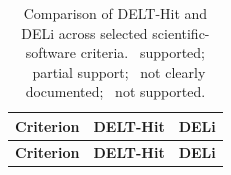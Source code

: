 \documentclass[pdflatex,sn-nature]{sn-jnl}
\begin{document}
\newcommand{\statusgreen}{\raisebox{0.15ex}{\textcolor{green!50!black}{\LARGE$\bullet$}}}
\newcommand{\statusamber}{\raisebox{0.15ex}{\textcolor{orange!90!black}{\LARGE$\bullet$}}}
\newcommand{\statusopen}{\raisebox{0.15ex}{\textcolor{black!30}{\LARGE$\bullet$}}}
\newcommand{\statusred}{\raisebox{0.15ex}{\textcolor{blue!70!black}{\LARGE$\bullet$}}}
\begin{longtable}{p{8.8cm}>{\centering\arraybackslash}p{2.8cm}>{\centering\arraybackslash}p{1.2cm}}
\caption{Comparison of DELT-Hit and DELi\cite{wellnitz_opensourcednaencodedlibrary_2025} across selected scientific-software criteria. \statusgreen\ supported; \statusamber\ partial support; \statusopen\ not clearly documented; \statusred\ not supported.}
\label{tab:delt-deli-comparison} \\
\toprule
\textbf{Criterion} & \textbf{DELT-Hit} & \textbf{DELi} \\
\midrule
\endfirsthead

\toprule
\textbf{Criterion} & \textbf{DELT-Hit} & \textbf{DELi} \\
\midrule
\endhead


\end{longtable}
\end{document}
